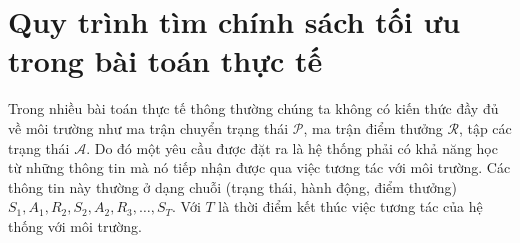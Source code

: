 \section{Quy trình tìm chính sách tối ưu trong bài toán thực tế}
Trong nhiều bài toán thực tế thông thường chúng ta không có kiến thức đầy đủ về môi trường như ma trận chuyển trạng thái $\mathcal{P}$, ma trận điểm thưởng $\mathcal{R}$, tập các trạng thái $\mathcal{A}$. Do đó một yêu cầu được đặt ra là hệ thống phải có khả năng học từ những thông tin mà nó tiếp nhận được qua việc tương tác với môi trường. Các thông tin này thường ở dạng chuỗi (trạng thái, hành động, điểm thưởng)
$\mathit{S}_1, \mathit{A}_1, \mathit{R}_2, \mathit{S}_2, \mathit{A}_2, \mathit{R}_3, \dots, \mathit{S}_T$. Với $T$ là thời điểm kết thúc việc tương tác của hệ thống với môi trường.


